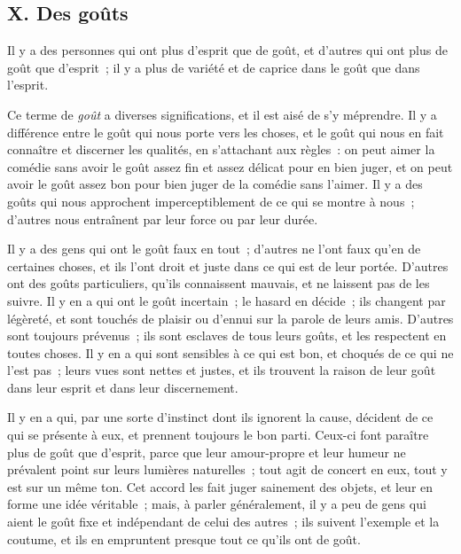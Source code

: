 \documentclass[french,twoside]{book} %
\begin{document}
\subsection[{X. Des goûts}]{X. Des goûts}
\noindent Il y a des personnes qui ont plus d’esprit que de goût, et d’autres qui ont plus de goût que d’esprit ; il y a plus de variété et de caprice dans le goût que dans l’esprit.\par
Ce terme de {\itshape goût} a diverses significations, et il est aisé de s’y méprendre. Il y a différence entre le goût qui nous porte vers les choses, et le goût qui nous en fait connaître et discerner les qualités, en s’attachant aux règles : on peut aimer la comédie sans avoir le goût assez fin et assez délicat pour en bien juger, et on peut avoir le goût assez bon pour bien juger de la comédie sans l’aimer. Il y a des goûts qui nous approchent imperceptiblement de ce qui se montre à nous ; d’autres nous entraînent par leur force ou par leur durée.\par
Il y a des gens qui ont le goût faux en tout ; d’autres ne l’ont faux qu’en de certaines choses, et ils l’ont droit et juste dans ce qui est de leur portée. D’autres ont des goûts particuliers, qu’ils connaissent mauvais, et ne laissent pas de les suivre. Il y en a qui ont le goût incertain ; le hasard en décide ; ils changent par légèreté, et sont touchés de plaisir ou d’ennui sur la parole de leurs amis. D’autres sont toujours prévenus ; ils sont esclaves de tous leurs goûts, et les respectent en toutes choses. Il y en a qui sont sensibles à ce qui est bon, et choqués de ce qui ne l’est pas ; leurs vues sont nettes et justes, et ils trouvent la raison de leur goût dans leur esprit et dans leur discernement.\par
Il y en a qui, par une sorte d’instinct dont ils ignorent la cause, décident de ce qui se présente à eux, et prennent toujours le bon parti. Ceux-ci font paraître plus de goût que d’esprit, parce que leur amour-propre et leur humeur ne prévalent point sur leurs lumières naturelles ; tout agit de concert en eux, tout y est sur un même ton. Cet accord les fait juger sainement des objets, et leur en forme une idée véritable ; mais, à parler généralement, il y a peu de gens qui aient le goût fixe et indépendant de celui des autres ; ils suivent l’exemple et la coutume, et ils en empruntent presque tout ce qu’ils ont de goût.\par
\end{document}
